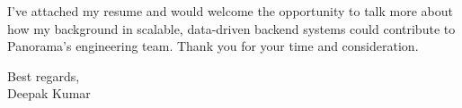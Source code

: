 \documentclass[11pt,a4paper]{article}
\begin{document}
{\color{darktext}
I've attached my resume and would welcome the opportunity to talk more about how my background in
scalable, data-driven backend systems could contribute to Panorama's engineering team. Thank you for
your time and consideration.
}\par
\vspace{18pt}

{\color{darktext}
Best regards, \\[4pt]
Deepak Kumar
}\par
\end{document}
